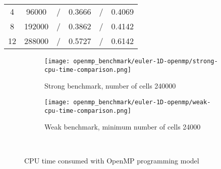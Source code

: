 \begin{table}[!ht]
\begin{subtable}[b]{0.80\textwidth}
{\begin{tabular}{cccccc}
      4                              & 96000                 & /             & 0.3666          & /                 & 0.4069              \\
      8                              & 192000                & /             & 0.3862          & /                 & 0.4142              \\
      12                             & 288000                & /             & 0.5727          & /                 & 0.6142              \\
      \hline
    \end{tabular}}
  \end{subtable}
\end{table}

\begin{figure}[!ht]
  \centering
  \begin{subfigure}[b]{0.40\textwidth}
    \centering
    \texttt{[image: openmp\_benchmark/euler-1D-openmp/strong-cpu-time-comparison.png]}
    \caption{Strong benchmark, number of cells 240000}\label{fig:strong-cpu-time-openmp}
  \end{subfigure}\quad%
  \begin{subfigure}[b]{0.40\textwidth}
    \centering
    \texttt{[image: openmp\_benchmark/euler-1D-openmp/weak-cpu-time-comparison.png]}
    \caption{Weak benchmark, minimum number of cells 24000}\label{fig:weak-cpu-time-openmp}
  \end{subfigure}\\
  \caption{CPU time consumed with OpenMP programming model}\label{fig:cpu-time-openmp}
\end{figure}

